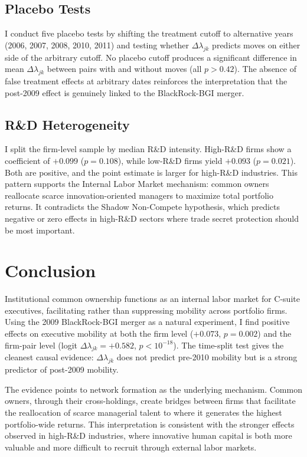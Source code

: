 \documentclass[11pt,a4paper]{article}
\begin{document}
\subsection{Placebo Tests}

I conduct five placebo tests by shifting the treatment cutoff to alternative years (2006, 2007, 2008, 2010, 2011) and testing whether $\Delta\lambda_{jk}$ predicts moves on either side of the arbitrary cutoff. No placebo cutoff produces a significant difference in mean $\Delta\lambda_{jk}$ between pairs with and without moves (all $p>0.42$). The absence of false treatment effects at arbitrary dates reinforces the interpretation that the post-2009 effect is genuinely linked to the BlackRock-BGI merger.

\subsection{R\&D Heterogeneity}

I split the firm-level sample by median R\&D intensity. High-R\&D firms show a coefficient of $+0.099$ ($p=0.108$), while low-R\&D firms yield $+0.093$ ($p=0.021$). Both are positive, and the point estimate is larger for high-R\&D industries. This pattern supports the Internal Labor Market mechanism: common owners reallocate scarce innovation-oriented managers to maximize total portfolio returns. It contradicts the Shadow Non-Compete hypothesis, which predicts negative or zero effects in high-R\&D sectors where trade secret protection should be most important.

\newpage

\section{Conclusion}
\label{sec:conc}

Institutional common ownership functions as an internal labor market for C-suite executives, facilitating rather than suppressing mobility across portfolio firms. Using the 2009 BlackRock-BGI merger as a natural experiment, I find positive effects on executive mobility at both the firm level ($+0.073$, $p=0.002$) and the firm-pair level (logit $\Delta\lambda_{jk}=+0.582$, $p<10^{-18}$). The time-split test gives the cleanest causal evidence: $\Delta\lambda_{jk}$ does not predict pre-2010 mobility but is a strong predictor of post-2009 mobility.

The evidence points to network formation as the underlying mechanism. Common owners, through their cross-holdings, create bridges between firms that facilitate the reallocation of scarce managerial talent to where it generates the highest portfolio-wide returns. This interpretation is consistent with the stronger effects observed in high-R\&D industries, where innovative human capital is both more valuable and more difficult to recruit through external labor markets.
\end{document}
